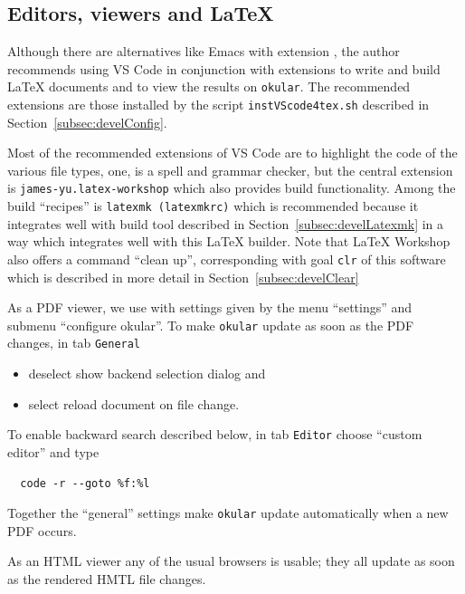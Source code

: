 \subsection{Editors, viewers and \LaTeX}\label{subsec:editViewLatex}

Although there are alternatives like Emacs with extension \auctex, 
the author recommends using VS Code in conjunction with extensions 
to write and build \LaTeX{} documents 
and to view the results on \texttt{okular}. 
The recommended extensions are those 
installed by the script \texttt{instVScode4tex.sh} 
described in Section~\ref{subsec:develConfig}. 

Most of the recommended extensions of VS Code 
are to highlight the code of the various file types, 
one, \ltex{} is a spell and grammar checker, 
but the central extension is \texttt{james-yu.latex-workshop} 
which also provides build functionality. 
Among the build ``recipes'' is \texttt{latexmk (latexmkrc)} 
which is recommended because it integrates well with build tool  
described in Section~\ref{subsec:develLatexmk} 
in a way which integrates  well with this \LaTeX{} builder. 
Note that \LaTeX{} Workshop also offers a command ``clean up'', 
corresponding with goal \texttt{clr} of this software 
which is described in more detail in Section~\ref{subsec:develClear}

As a PDF viewer, we use  
with settings given by the menu ``settings'' 
and submenu ``configure okular''. 
To make \texttt{okular} update as soon as the PDF changes, 
in tab \texttt{General} 
\begin{itemize}
  \item deselect show backend selection dialog and 
  \item select reload document on file change. 
\end{itemize}

To enable backward search described below, 
in tab \texttt{Editor} choose ``custom editor'' and type 
%
\begin{Verbatim}
  code -r --goto %f:%l
\end{Verbatim}

Together the ``general'' settings make \texttt{okular} update automatically 
when a new PDF occurs. 

As an HTML viewer any of the usual browsers is usable; 
they all update as soon as the rendered HMTL file changes. 

